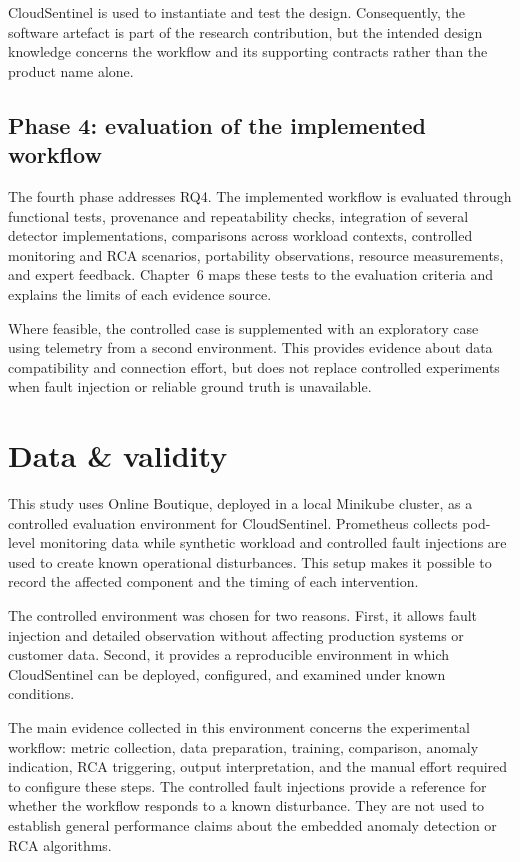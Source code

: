 CloudSentinel is used to instantiate and test the design. Consequently, the software artefact is part of the research contribution, but the intended design knowledge concerns the workflow and its supporting contracts rather than the product name alone.

\subsection{Phase 4: evaluation of the implemented workflow}

The fourth phase addresses RQ4. The implemented workflow is evaluated through functional tests, provenance and repeatability checks, integration of several detector implementations, comparisons across workload contexts, controlled monitoring and RCA scenarios, portability observations, resource measurements, and expert feedback. Chapter~6 maps these tests to the evaluation criteria and explains the limits of each evidence source.

Where feasible, the controlled case is supplemented with an exploratory case using telemetry from a second environment. This provides evidence about data compatibility and connection effort, but does not replace controlled experiments when fault injection or reliable ground truth is unavailable.

\section{Data \& validity}
This study uses Online Boutique, deployed in a local Minikube cluster, as a controlled evaluation environment for CloudSentinel. Prometheus collects pod-level monitoring data while synthetic workload and controlled fault injections are used to create known operational disturbances. This setup makes it possible to record the affected component and the timing of each intervention.

The controlled environment was chosen for two reasons. First, it allows fault injection and detailed observation without affecting production systems or customer data. Second, it provides a reproducible environment in which CloudSentinel can be deployed, configured, and examined under known conditions.

The main evidence collected in this environment concerns the experimental workflow: metric collection, data preparation, training, comparison, anomaly indication, RCA triggering, output interpretation, and the manual effort required to configure these steps. The controlled fault injections provide a reference for whether the workflow responds to a known disturbance. They are not used to establish general performance claims about the embedded anomaly detection or RCA algorithms.

